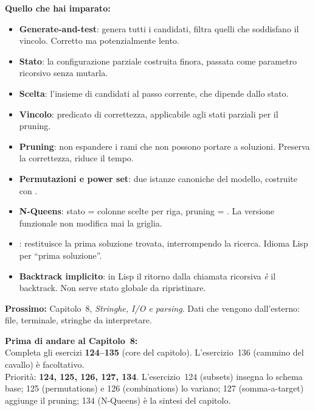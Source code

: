 \begin{tcolorbox}[
  enhanced,
  colback=csBlue!5, colframe=csBlue!40,
  arc=4pt, boxrule=0.6pt,
  left=14pt, right=14pt, top=12pt, bottom=12pt,
  before skip=16pt, after skip=16pt
]
\textbf{Quello che hai imparato:}

\medskip
\begin{itemize}
  \item \textbf{Generate-and-test}: genera tutti i candidati, filtra
        quelli che soddisfano il vincolo. Corretto ma potenzialmente lento.
  \item \textbf{Stato}: la configurazione parziale costruita finora,
        passata come parametro ricorsivo senza mutarla.
  \item \textbf{Scelta}: l'insieme di candidati al passo corrente,
        che dipende dallo stato.
  \item \textbf{Vincolo}: predicato di correttezza, applicabile
        agli stati parziali per il pruning.
  \item \textbf{Pruning}: non espandere i rami che non possono portare
        a soluzioni. Preserva la correttezza, riduce il tempo.
  \item \textbf{Permutazioni e power set}: due istanze canoniche
        del modello, costruite con .
  \item \textbf{N-Queens}: stato = colonne scelte per riga,
        pruning = . La versione funzionale non modifica
        mai la griglia.
  \item \textbf{}: restituisce la prima soluzione trovata,
        interrompendo la ricerca. Idioma Lisp per ``prima soluzione''.
  \item \textbf{Backtrack implicito}: in Lisp il ritorno dalla
        chiamata ricorsiva \emph{è} il backtrack. Non serve
        stato globale da ripristinare.
\end{itemize}

\medskip
\textbf{Prossimo:} Capitolo~8, \emph{Stringhe, I/O e parsing}.
Dati che vengono dall'esterno: file, terminale, stringhe da interpretare.
\end{tcolorbox}

\begin{workbook}
\textbf{Prima di andare al Capitolo~8:}\\[4pt]
Completa gli esercizi \textbf{124--135} (core del capitolo).
L'esercizio~136 (cammino del cavallo) è facoltativo.\\[4pt]
Priorità: \textbf{124, 125, 126, 127, 134}.
L'esercizio~124 (subsets) insegna lo schema base;
125 (permutations) e 126 (combinations) lo variano;
127 (somma-a-target) aggiunge il pruning;
134 (N-Queens) è la sintesi del capitolo.
\end{workbook}
